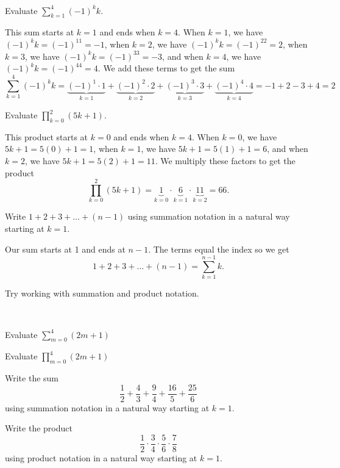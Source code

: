 \begin{exam}
\label{exam_sigma_pi}
~
    \begin{apart}
        \item Evaluate $\displaystyle \sum_{k=1}^4 (-1)^kk$.
            \begin{soln}
                This sum starts at $k=1$ and ends when $k=4$.  When $k=1$, we have $(-1)^kk=(-1)^11=-1$,
                when $k=2$, we have $(-1)^kk=(-1)^22=2$,
                when $k=3$, we have $(-1)^kk=(-1)^33=-3$, and
                when $k=4$, we have $(-1)^kk=(-1)^44=4$.
                We add these terms to get the sum 
                $$\sum_{k=1}^4 (-1)^kk =\underbrace{(-1)^1\cdot 1}_{k=1}+
                \underbrace{(-1)^2\cdot 2}_{k=2}+
                \underbrace{(-1)^3\cdot 3}_{k=3}+
                \underbrace{(-1)^4\cdot 4}_{k=4}
                =-1 + 2 - 3 + 4 = 2$$
            \end{soln}
        \item Evaluate $\displaystyle \prod_{k=0}^2(5k+1)$.
            \begin{soln}
                This product starts at $k=0$ and ends when $k=4$.  When $k=0$, we have $5k+1=5(0)+1= 1$,
                when $k=1$, we have $5k+1=5(1)+1 = 6$, and
                when $k=2$, we have $5k+1=5(2)+1 = 11$.
                We multiply these factors to get the product 
                $$\prod_{k=0}^2(5k+1) = 
                \underbrace{1}_{k=0} 
                \cdot \underbrace{6}_{k=1} 
                \cdot \underbrace{11}_{k=2} 
                = 66.$$
            \end{soln}
        \item Write $1 + 2 + 3 + \ldots + (n-1)$   
        using summation notation in a natural way starting at $k=1$.
            \begin{soln}
                Our sum starts at 1 and ends at $n-1$. 
                The terms equal the index so we get $$1 + 2 + 3 + \ldots + (n-1) = \sum_{k=1}^{n-1}k.$$
            \end{soln}
    \end{apart}   
\end{exam}

Try working with summation and product notation.

\begin{act}
\label{exer_sigma_pi}
~
    \begin{actpart}
        \item Evaluate $\displaystyle  \sum_{m=0}^4 (2m+1)$
        \item Evaluate $\displaystyle  \prod_{m=0}^4 (2m+1)$
        \item Write the sum
            $$\frac{1}{2} + \frac{4}{3} + \frac{9}{4} + \frac{16}{5}+ \frac{25}{6}$$
        using summation notation in a natural way starting at $k=1$.
        \item Write the product
            $$\frac{1}{2} \cdot \frac{3}{4}\cdot \frac{5}{6}\cdot \frac{7}{8}$$
        using product notation in a natural way starting at $k=1$.       
    \end{actpart}
\end{act}

